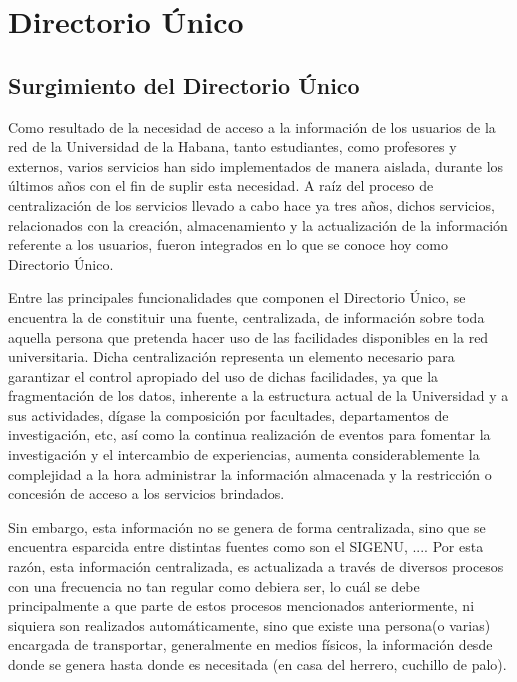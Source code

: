 \chapter{Directorio \'Unico}

\section{Surgimiento del Directorio \'Unico}

Como resultado de la necesidad de acceso a la informaci\'on de los usuarios de la red de la Universidad de la Habana, tanto estudiantes, como profesores y externos, varios servicios han sido implementados de manera aislada, durante los \'ultimos años con el fin de suplir esta necesidad. A ra\'iz del proceso de centralizaci\'on de los servicios llevado a cabo hace ya tres años, dichos servicios, relacionados con la creaci\'on, almacenamiento y la actualizaci\'on de la informaci\'on referente a los usuarios, fueron integrados en lo que se conoce hoy como Directorio \'Unico.

Entre las principales funcionalidades que componen el Directorio \'Unico, se encuentra la de constituir una fuente, centralizada, de informaci\'on sobre toda aquella persona que pretenda hacer uso de las facilidades disponibles en la red universitaria. Dicha centralizaci\'on representa un elemento necesario para garantizar el control apropiado del uso de dichas facilidades, ya que la fragmentaci\'on de los datos, inherente a la estructura actual de la Universidad y a sus actividades, d\'igase la composici\'on por facultades, departamentos de investigaci\'on, etc, as\'i como la continua realizaci\'on de eventos para fomentar la investigaci\'on y el intercambio de experiencias, aumenta considerablemente la complejidad a la hora administrar la informaci\'on almacenada y la restricci\'on o concesi\'on de acceso a los servicios brindados. 

Sin embargo, esta informaci\'on no se genera de forma centralizada, sino que se encuentra esparcida entre distintas fuentes como son el SIGENU, ....  
Por esta raz\'on, esta informaci\'on centralizada, es actualizada a trav\'es de diversos procesos con una frecuencia no tan regular como debiera ser, lo cu\'al se debe principalmente a que parte de estos procesos mencionados anteriormente, ni siquiera son realizados autom\'aticamente, sino que existe una persona(o varias) encargada de transportar, generalmente en medios f\'isicos, la informaci\'on desde donde se genera hasta donde es necesitada (en casa del herrero, cuchillo de palo).

